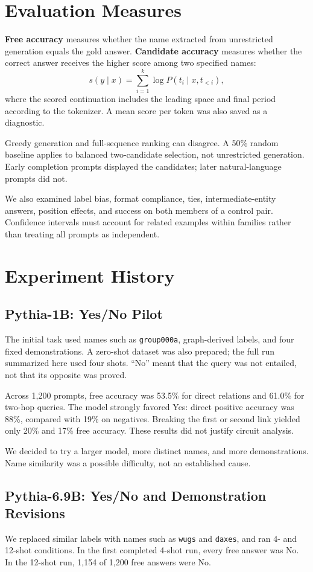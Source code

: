 \documentclass[11pt,a4paper]{article}
\begin{document}
\section{Evaluation Measures}
\textbf{Free accuracy} measures whether the name extracted from unrestricted generation equals the gold answer. \textbf{Candidate accuracy} measures whether the correct answer receives the higher score among two specified names:
\[
s(y\mid x)=\sum_{i=1}^{k}\log P(t_i\mid x,t_{<i}),
\]
where the scored continuation includes the leading space and final period according to the tokenizer. A mean score per token was also saved as a diagnostic.

Greedy generation and full-sequence ranking can disagree. A 50\% random baseline applies to balanced two-candidate selection, not unrestricted generation. Early completion prompts displayed the candidates; later natural-language prompts did not.

We also examined label bias, format compliance, ties, intermediate-entity answers, position effects, and success on both members of a control pair. Confidence intervals must account for related examples within families rather than treating all prompts as independent.

\section{Experiment History}
\subsection{Pythia-1B: Yes/No Pilot}
The initial task used names such as \texttt{group000a}, graph-derived labels, and four fixed demonstrations. A zero-shot dataset was also prepared; the full run summarized here used four shots. ``No'' meant that the query was not entailed, not that its opposite was proved.

Across 1,200 prompts, free accuracy was 53.5\% for direct relations and 61.0\% for two-hop queries. The model strongly favored Yes: direct positive accuracy was 88\%, compared with 19\% on negatives. Breaking the first or second link yielded only 20\% and 17\% free accuracy. These results did not justify circuit analysis.

We decided to try a larger model, more distinct names, and more demonstrations. Name similarity was a possible difficulty, not an established cause.

\subsection{Pythia-6.9B: Yes/No and Demonstration Revisions}
We replaced similar labels with names such as \texttt{wugs} and \texttt{daxes}, and ran 4- and 12-shot conditions. In the first completed 4-shot run, every free answer was No. In the 12-shot run, 1,154 of 1,200 free answers were No.
\end{document}

